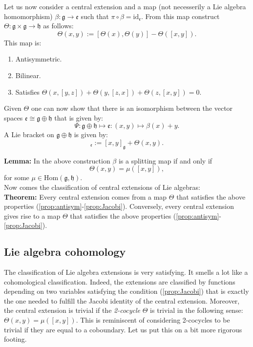 \documentclass[submission, PhysLectNotes]{SciPost}
\begin{document}
Let us now consider a central extension and a map (not necesserily a Lie algebra homomorphism) $\beta:\mathfrak{g}\rightarrow\mathfrak{e}$ such that $\pi\circ\beta = \text{id}_{\mathfrak{e}}$. From this map construct
$\Theta: \mathfrak{g}\times\mathfrak{g}\rightarrow\mathfrak{h}$ as follows:
\begin{equation}
	\Theta(x,y) := \left[\Theta(x),\Theta(y)\right] - \Theta\left([x,y]\right).
\end{equation}
This map is:
\begin{enumerate}
	\item \label{prop:antisym} Antisymmetric.
	\item \label{prop:bilinear} Bilinear.
	\item \label{prop:Jacobi} Satisfies $\Theta(x,[y,z]) + \Theta(y,[z,x]) + \Theta(z,[x,y]) = 0$.
\end{enumerate}
Given $\Theta$ one can now show that there is an isomorphism between the vector spaces $\mathfrak{e}\cong\mathfrak{g}\oplus\mathfrak{h}$ that is given by:
\begin{equation}
	\Psi:\mathfrak{g}\oplus\mathfrak{h}\mapsto\mathfrak{e}:(x,y)\mapsto\beta(x) + y.
\end{equation}
A Lie bracket on $\mathfrak{g}\oplus\mathfrak{h}$ is given by:
\begin{equation}
	[x\oplus z, y\oplus z']_{\mathfrak{e}} := [x,y]_\mathfrak{g} + \Theta(x,y).
\end{equation}

{\bf Lemma:} In the above construction $\beta$ is a splitting map if and only if
\begin{equation}
	\Theta(x,y) = \mu([x,y]),
\end{equation}
for some $\mu\in\text{Hom}(\mathfrak{g},\mathfrak{h})$.\\

Now comes the classification of central extensions of Lie algebras:\\

{\bf Theorem:} Every central extension comes from a map $\Theta$ that satisfies the above properties (\ref{prop:antisym}-\ref{prop:Jacobi}). Conversely, every central extension gives rise to a map $\Theta$ that satisfies the above properties (\ref{prop:antisym}-\ref{prop:Jacobi}).

\subsection{Lie algebra cohomology}
The classification of Lie algebra extensions is very satisfying. It smells a lot like a cohomological classification. Indeed, the extensions are classified by functions depending on two variables satisfying the condition (\ref{prop:Jacobi}) that is exactly the one needed to fulfill the Jacobi identity of the central extension. Moreover, the central extension is trivial if the \emph{2-cocycle} $\Theta$ is trivial in the following sense: $\Theta(x,y) = \mu([x,y])$. This is reminiscent of considering 2-cocycles to be trivial if they are equal to a coboundary. Let us put this on a bit more rigorous footing.\\
\end{document}
